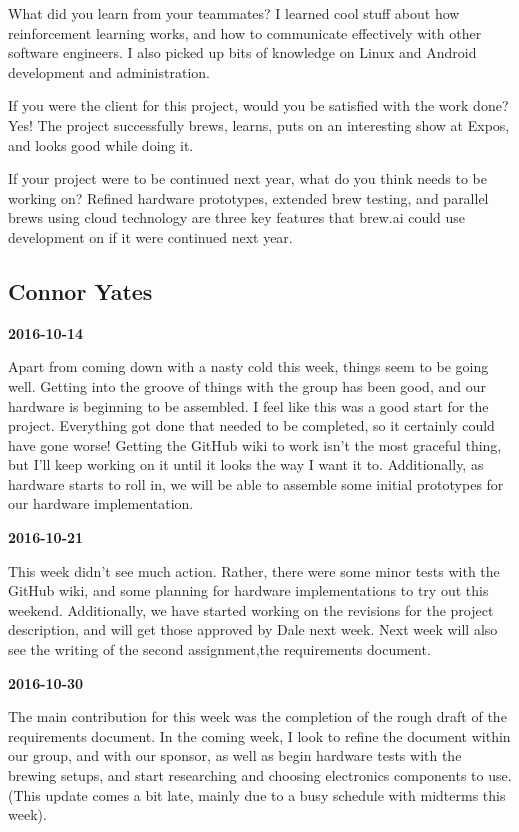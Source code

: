  What did you learn from your teammates?
I learned cool stuff about how reinforcement learning works, and how to communicate effectively with other software engineers. I also picked up bits of knowledge on Linux and Android development and administration.

 If you were the client for this project, would you be satisfied with the work done?
Yes! The project successfully brews, learns, puts on an interesting show at Expos, and looks good while doing it.

 If your project were to be continued next year, what do you think needs to be working on?
Refined hardware prototypes, extended brew testing, and parallel brews using cloud technology are three key features that brew.ai could use development on if it were continued next year.

\subsection{Connor Yates}

\textbf{2016-10-14} 

Apart from coming down with a nasty cold this week, things seem to be going well. Getting into the groove of things with the group has been good, and our hardware is beginning to be assembled. I feel like this was a good start for the project. Everything got done that needed to be completed, so it certainly could have gone worse!
Getting the GitHub wiki to work isn't the most graceful thing, but I'll keep working on it until it looks the way I want it to. Additionally, as hardware starts to roll in, we will be able to assemble some initial prototypes for our hardware implementation.

\textbf{2016-10-21} 

This week didn't see much action. Rather, there were some minor tests with the GitHub wiki, and some planning for hardware implementations to try out this weekend. Additionally, we have started working on the revisions for the project description, and will get those approved by Dale next week. Next week will also see the writing of the second assignment,the requirements document.

\textbf{2016-10-30} 

The main contribution for this week was the completion of the rough draft of the requirements document.
In the coming week, I look to refine the document within our group, and with our sponsor, as well as begin hardware tests with the brewing setups, and start researching and choosing electronics components to use.
(This update comes a bit late, mainly due to a busy schedule with midterms this week).

